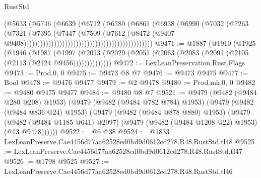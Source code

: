 \begin{lexlean}{RustStd}
\begin{coremodule}
                                                                (@5633
                                                                  (@5746
                                                                    (@6639
                                                                      (@6712
                                                                        (@6780
                                                                          (@6861
                                                                            (@6938
                                                                              (@6990
                                                                                (@7032
                                                                                  (@7263
                                                                                    (@7321
                                                                                      (@7395
                                                                                        (@7447
                                                                                          (@7509
                                                                                            (@7612
                                                                                              (@8472
                                                                                                (@9407
                                                                                                  @9408)))))))))))))))))))))))))))))))))))))))))))))))
@9471 := @1887
    (@1910
      (@1925
        (@1946
          (@1987
            (@1997
              (@2013 (@2029 (@2051 (@2063 (@2083 (@2091 (@2105 (@2113 (@2124 @9456))))))))))))))
@9472 := LexLeanPreservation.Rust.Flags
@9473 := Prod.{0, 0}
@9475 := @9473 @8 @7
@9476 := @9473 @9475
@9477 := Bool
@9478 := @9476 @9477
@9479 := @2 @9478
@9480 := Prod.mk.{0, 0}
@9482 := @9480 @9475 @9477
@9484 := @9480 @8 @7
@9521 := @9479
    (@9482 (@9484 @280 @208) @1953)
    (@9479
      (@9482 (@9484 @782 @784) @1953)
      (@9479
        (@9482 (@9484 @836 @24) @1953)
        (@9479
          (@9482 (@9484 @878 @880) @1953)
          (@9479
            (@9482 (@9484 @1185 @641) @2097)
            (@9479 (@9482 (@9484 @1208 @22) @1953) (@13 @9478))))))
@9522 := @6 @38
@9524 := @1833 LexLeanPreserve.Cae4456d77aa62528ed0bd9d0612cd278.R48.RustStd.tl48
@9525 := LexLeanPreserve.Cae4456d77aa62528ed0bd9d0612cd278.R48.RustStd.tl47
@9526 := @1798 @9525
@9527 := LexLeanPreserve.Cae4456d77aa62528ed0bd9d0612cd278.R48.RustStd.tl46

\end{coremodule}
\end{lexlean}
